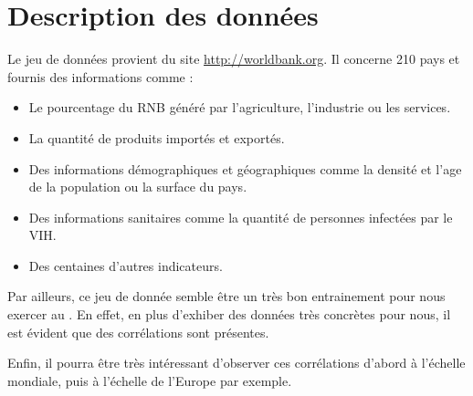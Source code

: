 \section{Description des données}
Le jeu de données provient du site \url{http://worldbank.org}. Il concerne 210 pays et fournis des informations comme :
\begin{itemize}
	\item Le pourcentage du \gls{RNB} généré par l'agriculture, l'industrie ou les services.
	\item La quantité de produits importés et exportés.
	\item Des informations démographiques et géographiques comme la densité et l'age de la population ou la surface du pays.
	\item Des informations sanitaires comme la quantité de personnes infectées par le \gls{VIH}.
	\item Des centaines d'autres indicateurs.
\end{itemize}
Par ailleurs, ce jeu de donnée semble être un très bon entrainement pour nous exercer au . En effet, en plus d'exhiber des données très concrètes pour nous, il est évident que des corrélations sont présentes. 

Enfin, il pourra être très intéressant d'observer ces corrélations d'abord à l'échelle mondiale, puis à l'échelle de l'Europe par exemple. 


